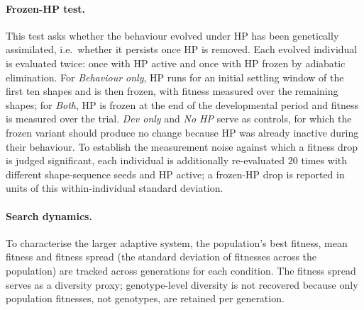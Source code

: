 \paragraph{Frozen-HP test.}
This test asks whether the behaviour evolved under HP has been genetically
assimilated, i.e.\ whether it persists once HP is removed. Each evolved
individual is evaluated twice: once with HP active and once with HP frozen by
adiabatic elimination. For \emph{Behaviour only}, HP runs for an initial
settling window of the first ten shapes and is then frozen, with fitness
measured over the remaining shapes; for \emph{Both}, HP is frozen at the end of
the developmental period and fitness is measured over the trial. \emph{Dev only}
and \emph{No HP} serve as controls, for which the frozen variant should produce
no change because HP was already inactive during their behaviour. To establish
the measurement noise against which a fitness drop is judged significant, each
individual is additionally re-evaluated $20$ times with different shape-sequence
seeds and HP active; a frozen-HP drop is reported in units of this
within-individual standard deviation.

\paragraph{Search dynamics.}
To characterise the larger adaptive system, the population's best fitness, mean
fitness and fitness spread (the standard deviation of fitnesses across the
population) are tracked across generations for each condition. The fitness
spread serves as a diversity proxy; genotype-level diversity is not recovered
because only population fitnesses, not genotypes, are retained per generation.
